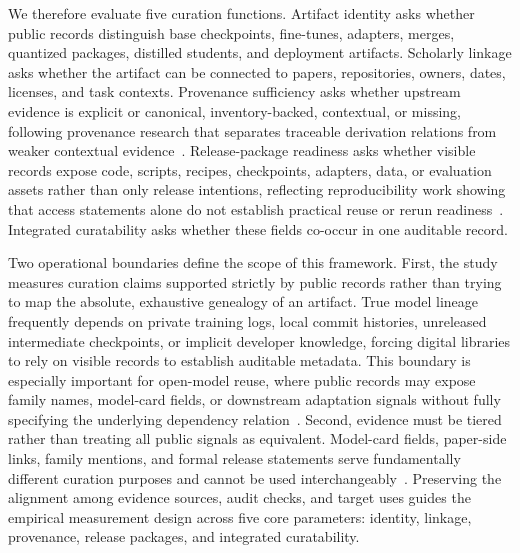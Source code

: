 We therefore evaluate five curation functions. Artifact identity asks whether public records distinguish base checkpoints, fine-tunes, adapters, merges, quantized packages, distilled students, and deployment artifacts. Scholarly linkage asks whether the artifact can be connected to papers, repositories, owners, dates, licenses, and task contexts. Provenance sufficiency asks whether upstream evidence is explicit or canonical, inventory-backed, contextual, or missing, following provenance research that separates traceable derivation relations from weaker contextual evidence~\cite{moreau2013prov,davidson2008provenance,herschel2017survey}. Release-package readiness asks whether visible records expose code, scripts, recipes, checkpoints, adapters, data, or evaluation assets rather than only release intentions, reflecting reproducibility work showing that access statements alone do not establish practical reuse or rerun readiness~\cite{dodge2019show,pineau2021reproducibility,akella2023effort}. Integrated curatability asks whether these fields co-occur in one auditable record.

Two operational boundaries define the scope of this framework. First, the study measures curation claims supported strictly by public records rather than trying to map the absolute, exhaustive genealogy of an artifact. True model lineage frequently depends on private training logs, local commit histories, unreleased intermediate checkpoints, or implicit developer knowledge, forcing digital libraries to rely on visible records to establish auditable metadata. This boundary is especially important for open-model reuse, where public records may expose family names, model-card fields, or downstream adaptation signals without fully specifying the underlying dependency relation~\cite{jiang2023ptmreuse,taraghi2024modelreuse,white2024mof}. Second, evidence must be tiered rather than treating all public signals as equivalent. Model-card fields, paper-side links, family mentions, and formal release statements serve fundamentally different curation purposes and cannot be used interchangeably~\cite{mitchell2019modelcards,pepe2024hfdocs,kadasi2025modelhubs,salsabil2025context}. Preserving the alignment among evidence sources, audit checks, and target uses guides the empirical measurement design across five core parameters: identity, linkage, provenance, release packages, and integrated curatability.
